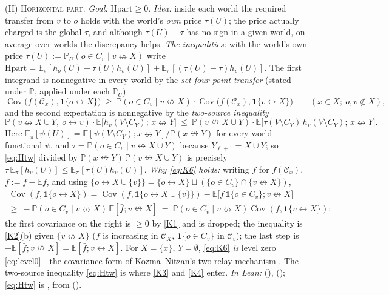 \documentclass[11pt]{article}
\theoremstyle{definition}
\theoremstyle{remark}
\newcommand{\PP}{\mathbb{P}}
\newcommand{\E}{\mathbb{E}}
\DeclareMathOperator{\Cov}{Cov}
\newcommand{\con}{\leftrightarrow}
\newcommand{\ncon}{\nleftrightarrow}
\newcommand{\one}{\mathbf 1}
\newcommand{\eC}{\mathcal{C}}
\begin{document}
\textsc{(H) Horizontal part.}  \emph{Goal:} $\mathrm{Hpart}\ge0$.  \emph{Idea:} inside each world the required transfer from $v$ to $o$ holds with the
world's \emph{own} price $\tau(U)$; the price actually charged is the global $\tau$, and although $\tau(U)-\tau$ has no sign in a given world, on average
over worlds the discrepancy helps.  \emph{The inequalities:} with the world's own price $\tau(U):=\PP_U(o\in C_v\mid v\ncon X)$ write
$\mathrm{Hpart}=\E_\pi[h_o(U)-\tau(U)h_v(U)]+\E_\pi[(\tau(U)-\tau)h_v(U)]$.  The first integrand is
nonnegative in every world by the \emph{set four-point transfer} (stated under $\PP$, applied under each $\PP_U$)
\begin{equation}\label{eq:K6}
 \Cov\bigl(f(\eC_x),\one\{o\con X\}\bigr)\ \ge\ \PP(o\in C_v\mid v\ncon X)\cdot\Cov\bigl(f(\eC_x),\one\{v\con X\}\bigr)\qquad(x\in X;\ o,v\notin X),
\end{equation}
and the second expectation is nonnegative by the \emph{two-source inequality}
\begin{equation}\label{eq:Htw}
 \PP(v\ncon X\cup Y,\ o\con v)\cdot\E\bigl[h_v(V\setminus C_Y);\,x\ncon Y\bigr]\ \le\ \PP(v\ncon X\cup Y)\cdot\E\bigl[\tau(V\setminus C_Y)\,h_v(V\setminus C_Y);\,x\ncon Y\bigr].
\end{equation}
Here $\E_\pi[\psi(U)]=\E[\psi(V\setminus C_Y);x\ncon Y]/\PP(x\ncon Y)$ for every world functional $\psi$, and $\tau=\PP(o\in C_v\mid v\ncon X\cup Y)$ because
$Y_{\ell+1}=X\cup Y$; so \eqref{eq:Htw} divided by $\PP(x\ncon Y)\,\PP(v\ncon X\cup Y)$ is precisely $\tau\,\E_\pi[h_v(U)]\le\E_\pi[\tau(U)h_v(U)]$.
\emph{Why \eqref{eq:K6} holds:} writing $f$ for $f(\eC_x)$, $\bar f:=f-\E f$, and using $\{o\con X\cup\{v\}\}=\{o\con X\}\sqcup(\{o\in C_v\}\cap\{v\ncon X\})$,
\begin{multline*}
 \Cov(f,\one\{o\con X\})=\Cov(f,\one\{o\con X\cup\{v\}\})-\E\bigl[\bar f\,\one\{o\in C_v\};v\ncon X\bigr]\\[-2pt]
 \ge\ -\PP(o\in C_v\mid v\ncon X)\,\E[\bar f;v\ncon X]\ =\ \PP(o\in C_v\mid v\ncon X)\Cov(f,\one\{v\con X\}):
\end{multline*}
the first covariance on the right is $\ge0$ by \ref{K1} and is dropped; the inequality is \ref{K2}(b) given $\{v\ncon X\}$ ($f$ is increasing in
$\eC_X$, $\one\{o\in C_v\}$ in $\eC_v$); the last step is $-\E[\bar f;v\ncon X]=\E[\bar f;v\con X]$.  For $X=\{x\}$, $Y=\emptyset$, \eqref{eq:K6} \emph{is} level zero \eqref{eq:level0}---the covariance
form of Kozma--Nitzan's two-relay mechanism \citep[Thm.~1]{KozmaNitzan2024}.  The two-source inequality \eqref{eq:Htw} is where \ref{K3} and \ref{K4}
enter.  \emph{In Lean:}  (), 
(); \eqref{eq:Htw} is , from  ().
\end{document}
